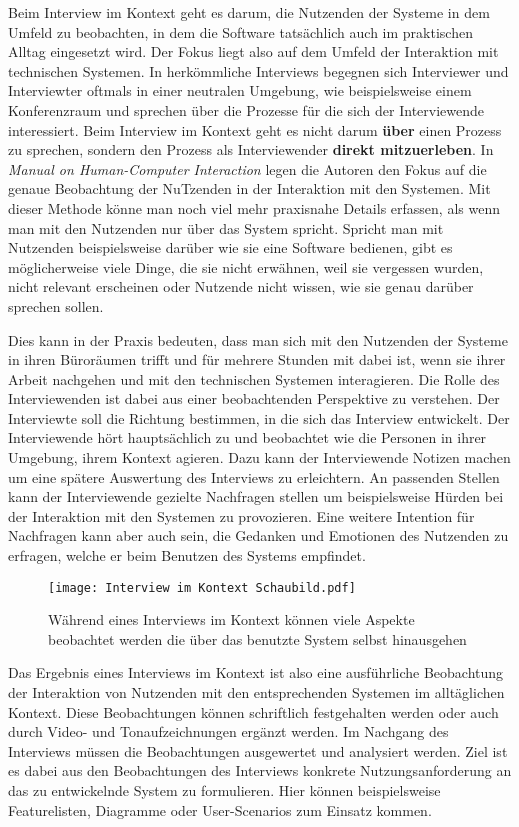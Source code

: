 Beim Interview im Kontext geht es darum, die Nutzenden der Systeme in dem
Umfeld zu beobachten, in dem die Software tatsächlich auch im praktischen
Alltag eingesetzt wird. Der Fokus liegt also auf dem Umfeld der Interaktion mit
technischen Systemen. In herkömmliche Interviews begegnen sich Interviewer und
Interviewter oftmals in einer neutralen Umgebung, wie beispielsweise einem
Konferenzraum und sprechen über die Prozesse für die sich der Interviewende
interessiert. Beim Interview im Kontext geht es nicht darum \textbf{über} einen
Prozess zu sprechen, sondern den Prozess als Interviewender \textbf{direkt
    mitzuerleben}.\cite{contextualDesign} In \textit{Manual on Human-Computer
    Interaction} legen die Autoren den Fokus auf die genaue Beobachtung der
NuTzenden in der Interaktion mit den Systemen. Mit dieser Methode könne man
noch viel mehr praxisnahe Details erfassen, als wenn man mit den Nutzenden nur
über das System spricht. Spricht man mit Nutzenden beispielsweise darüber wie
sie eine Software bedienen, gibt es möglicherweise viele Dinge, die sie nicht
erwähnen, weil sie vergessen wurden, nicht relevant erscheinen oder Nutzende
nicht wissen, wie sie genau darüber sprechen sollen.\cite{hciHandbook}

Dies kann in der Praxis bedeuten, dass man sich mit den Nutzenden der Systeme
in ihren Büroräumen trifft und für mehrere Stunden mit dabei ist, wenn sie
ihrer Arbeit nachgehen und mit den technischen Systemen interagieren. Die Rolle
des Interviewenden ist dabei aus einer beobachtenden Perspektive zu verstehen.
Der Interviewte soll die Richtung bestimmen, in die sich das Interview
entwickelt. Der Interviewende hört hauptsächlich zu und beobachtet wie die
Personen in ihrer Umgebung, ihrem Kontext agieren.\cite{hciHandbook} Dazu kann
der Interviewende Notizen machen um eine spätere Auswertung des Interviews zu
erleichtern. An passenden Stellen kann der Interviewende gezielte Nachfragen
stellen um beispielsweise Hürden bei der Interaktion mit den Systemen zu
provozieren. Eine weitere Intention für Nachfragen kann aber auch sein, die
Gedanken und Emotionen des Nutzenden zu erfragen, welche er beim Benutzen des
Systems empfindet.

\begin{figure}[h]
    \caption{Während eines Interviews im Kontext können viele Aspekte beobachtet werden die über das benutzte System selbst hinausgehen\cite{johannesGrafik}}
    \centering
    \texttt{[image: Interview im Kontext Schaubild.pdf]}
\end{figure}

Das Ergebnis eines Interviews im Kontext ist also eine ausführliche Beobachtung
der Interaktion von Nutzenden mit den entsprechenden Systemen im alltäglichen
Kontext. Diese Beobachtungen können schriftlich festgehalten werden oder auch
durch Video- und Tonaufzeichnungen ergänzt werden. Im Nachgang des Interviews
müssen die Beobachtungen ausgewertet und analysiert werden. Ziel ist es dabei
aus den Beobachtungen des Interviews konkrete Nutzungsanforderung an das zu
entwickelnde System zu formulieren. Hier können beispielsweise Featurelisten,
Diagramme oder User-Scenarios zum Einsatz kommen.\cite{HMI-HCD}

